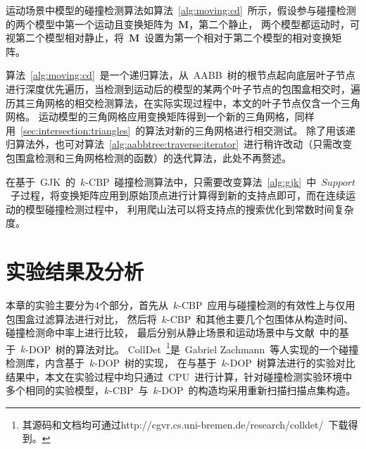 \begin{algorithm}[!ht]
\end{algorithm}

运动场景中模型的碰撞检测算法如算法~\ref{alg:moving:cd}~所示，假设参与碰撞检测的两个模型中第一个运动且变换矩阵为~$\bm{M}$，第二个静止，
两个模型都运动时，可视第二个模型相对静止，将~$\bm{M}$~设置为第一个相对于第二个模型的相对变换矩阵。

算法~\ref{alg:moving:cd}~是一个递归算法，从~AABB~树的根节点起向底层叶子节点进行深度优先遍历，当检测到运动后的模型的某两个叶子节点的包围盒相交时，遍历其三角网格的相交检测算法，在实际实现过程中，本文的叶子节点仅含一个三角网格。
运动模型的三角网格应用变换矩阵得到一个新的三角网格，同样用~\ref{sec:intersection:triangles}~的算法对新的三角网格进行相交测试。
除了用该递归算法外，也可对算法~\ref{alg:aabbtree:traverse:iterator}~进行稍许改动（只需改变包围盒检测和三角网格检测的函数）的迭代算法，此处不再赘述。

在基于~GJK~的~$k$-CBP~碰撞检测算法中，只需要改变算法~\ref{alg:gjk}~中~$Support$~子过程，将变换矩阵应用到原始顶点进行计算得到新的支持点即可，而在连续运动的模型碰撞检测过程中，
利用爬山法可以将支持点的搜索优化到常数时间复杂度\cite{bergen1999fast}。

\FloatBarrier
\section{实验结果及分析}
\label{sec:exper-cd}
本章的实验主要分为4个部分，首先从~$k$-CBP~应用与碰撞检测的有效性上与仅用包围盒过滤算法进行对比，
然后将~$k$-CBP~和其他主要几个包围体从构造时间、碰撞检测命中率上进行比较，
最后分别从静止场景和运动场景中与文献~中的基于~$k$-DOP~树的算法对比。
CollDet~\footnote{其源码和文档均可通过http://cgvr.cs.uni-bremen.de/research/colldet/~下载得到。}是~Gabriel Zachmann~等人实现的一个碰撞检测库\cite{abenchmarking2007}，内含基于~$k$-DOP~树的实现，
在与基于~$k$-DOP~树算法进行的实验对比结果中，本文在实验过程中均只通过~CPU~进行计算，针对碰撞检测实验环境中多个相同的实验模型，$k$-CBP~与~$k$-DOP~的构造均采用重新扫描扫描点集构造。

